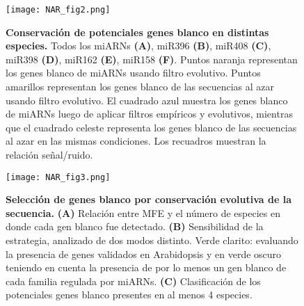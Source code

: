 \begin{figure}[htbp!] 
    \centering    
    \texttt{[image: NAR\_fig2.png]}
    \caption[Conservación de potenciales genes blanco en distintas especies]{\textbf{Conservación de potenciales genes blanco en distintas especies.}
    Todos los miARNs \textbf{(A)}, miR396 \textbf{(B)}, miR408 \textbf{(C)}, miR398 \textbf{(D)}, miR162 \textbf{(E)}, miR158 \textbf{(F)}.
    Puntos naranja representan los genes blanco de miARNs usando filtro evolutivo.
    Puntos amarillos representan los genes blanco de las secuencias al azar usando filtro evolutivo.
    El cuadrado azul muestra los genes blanco de miARNs luego de aplicar filtros empíricos y evolutivos, mientras que el cuadrado celeste representa los genes blanco de las secuencias al azar en las mismas condiciones.
    Los recuadros muestran la relación señal/ruido.}
    \label{fig:NAR_fig2}
\end{figure}

\begin{figure}[htbp!] 
    \centering    
    \texttt{[image: NAR\_fig3.png]}
    \caption[Selección de genes blanco por conservación evolutiva de la secuencia]{
    \textbf{Selección de genes blanco por conservación evolutiva de la secuencia.}
    \textbf{(A)} Relación entre MFE y el número de especies en donde cada gen blanco fue detectado.
    \textbf{(B)} Sensibilidad de la estrategia, analizado de dos modos distinto. 
    Verde clarito: evaluando la presencia de genes validados en Arabidopsis y en verde oscuro teniendo en cuenta la presencia de por lo menos un gen blanco de cada familia regulada por miARNs.
    \textbf{(C)} Clasificación de los potenciales genes blanco presentes en al menos 4 especies.}
    \label{fig:NAR_fig3}
\end{figure}



